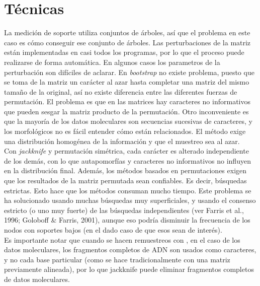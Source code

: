 \section{T\'ecnicas}
La medici\'on de soporte utiliza conjuntos de \'arboles, as\'i que el problema en este caso es c\'omo conseguir ese conjunto de \'arboles. Las perturbaciones de la matriz est\'an implementadas en casi todos los programas, por lo que el proceso puede realizarse de forma autom\'atica. En algunos casos los parametros de la perturbaci\'on son dif\'iciles de aclarar. En \textit{bootstrap} no existe problema, puesto que se toma de la matriz un car\'acter al azar hasta completar una matriz del mismo tama\~no de la original, as\'i no existe diferencia entre las diferentes fuerzas de permutaci\'on. El problema es que en las matrices hay caracteres no informativos que pueden sesgar la matriz producto de la permutaci\'on. Otro inconveniente es que la mayor\'ia de los datos moleculares son secuencias sucesivas de caracteres, y los morfol\'ogicos no es f\'acil entender c\'omo est\'an relacionados. El m\'etodo exige una distribuci\'on homog\'enea de la informaci\'on y que el muestreo sea al azar.\\
Con \textit{jackknife} y permutaci\'on sim\'etrica, cada car\'acter es alterado independiente de los dem\'as, con lo que autapomorf\'ias y caracteres no informativos no influyen en la distribuci\'on final. Adem\'as, los m\'etodos basados en permutaciones exigen que los resultados de la matriz permutada sean confiables. Es decir, b\'usquedas estrictas. Esto hace que los m\'etodos consuman mucho tiempo. Este problema se ha solucionado usando muchas b\'usquedas muy superficiales, y usando el consenso estricto (o uno muy fuerte) de las b\'usquedas independientes (ver Farris et al., 1996; Goloboff \& Farris, 2001), aunque eso podr\'ia disminuir la frecuencia de los nodos con soportes bajos (en el dado caso de que esos sean de inter\'es).\\
Es importante notar que cuando se hacen remuestreos con , en el caso de los datos moleculares, los fragmentos completos de ADN son usados como caracteres, y no cada base particular (como se hace tradicionalmente con una matriz previamente alineada), por lo que jackknife puede eliminar fragmentos completos de datos moleculares.\\
